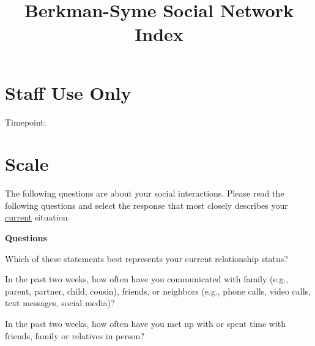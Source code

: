 \documentclass[
  english,
  a4paper,
  sdaps_style=qr,
  checkmode= check
]{sdapsclassic}
\title{Berkman-Syme Social Network Index}
\author{}
\date{}
\begin{document}
\begin{questionnaire}[noinfo]

\section{Staff Use Only}
    \begin{optionquestion}[cols=3, var=timepoint]{Timepoint:}
    \end{optionquestion}

\section{Scale}
The following questions are about your social interactions. Please read the following questions and select the response that most closely describes your \underline{current} situation.

\textbf{Questions}
\begin{optionquestion}[cols=2, singlechoice, var=bs01]{Which of these statements best represents your current relationship status?}
\end{optionquestion}

\begin{optionquestion}[cols=2, singlechoice, var=bs02]{In the past two weeks, how often have you communicated with family (e.g., parent, partner, child, cousin), friends, or neighbors (e.g., phone calls, video calls, text messages, social media)?}
\end{optionquestion}

\begin{optionquestion}[cols=2, singlechoice, var=bs03]{In the past two weeks, how often have you met up with or spent time with friends, family or relatives in person?}
\end{optionquestion}


\end{questionnaire}
\end{document}
